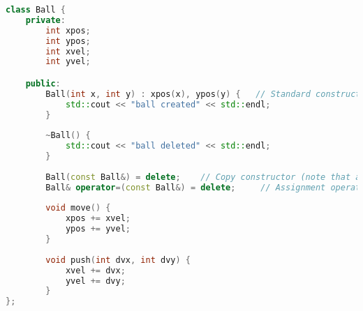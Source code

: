 \begin{lstlisting}[language=c++]
class Ball {
    private:
        int xpos;
		int ypos;
		int xvel;
		int yvel;

    public:
        Ball(int x, int y) : xpos(x), ypos(y) {   // Standard constructor
        	std::cout << "ball created" << std::endl;
        }
        		
        ~Ball() {
        	std::cout << "ball deleted" << std::endl;
        }
        
        Ball(const Ball&) = delete;    // Copy constructor (note that argument has no name when using delete)
		Ball& operator=(const Ball&) = delete;     // Assignment operator (note that argument has no name when using delete)
        
        void move() {
        	xpos += xvel;
        	ypos += yvel;
        }
        		
        void push(int dvx, int dvy) {
        	xvel += dvx;
        	yvel += dvy;
        }
};
\end{lstlisting}



